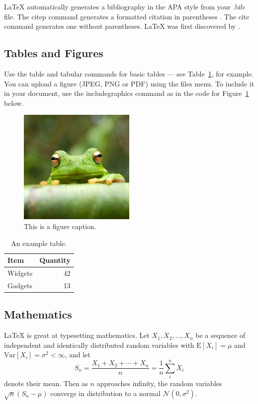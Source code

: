 \documentclass[letter,man,noextraspace,natbib]{apa6}
\begin{document}
LaTeX automatically generates a bibliography in the APA style from your .bib file. The citep command generates a formatted citation in parentheses \citep{Lamport1986}. The cite command generates one without parentheses. LaTeX was first discovered by \cite{Lamport1986}.

\subsection{Tables and Figures}

Use the table and tabular commands for basic tables --- see Table~\ref{tab:widgets}, for example. You can upload a figure (JPEG, PNG or PDF) using the files menu. To include it in your document, use the includegraphics command as in the code for Figure~\ref{fig:frog} below.

\begin{figure}
\centering
\includegraphics[width=0.5\textwidth]{frog.jpg}
\caption{\label{fig:frog}This is a figure caption.}
\end{figure}

\begin{table}
\centering
\begin{tabular}{l|r}
Item & Quantity \\\hline
Widgets & 42 \\
Gadgets & 13
\end{tabular}
\caption{\label{tab:widgets}An example table.}
\end{table}

\subsection{Mathematics}

\LaTeX{} is great at typesetting mathematics. Let $X_1, X_2, \ldots, X_n$ be a sequence of independent and identically distributed random variables with $\text{E}[X_i] = \mu$ and $\text{Var}[X_i] = \sigma^2 < \infty$, and let
$$S_n = \frac{X_1 + X_2 + \cdots + X_n}{n}
      = \frac{1}{n}\sum_{i}^{n} X_i$$
denote their mean. Then as $n$ approaches infinity, the random variables $\sqrt{n}(S_n - \mu)$ converge in distribution to a normal $\mathcal{N}(0, \sigma^2)$.
\end{document}
